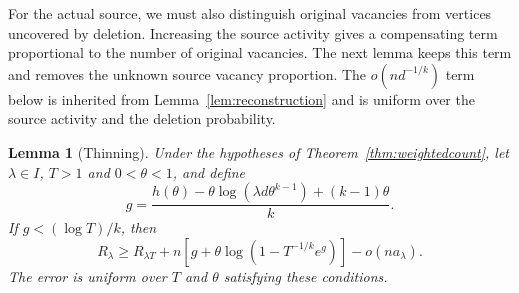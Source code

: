 \documentclass[11pt,reqno]{amsart}
\numberwithin{equation}{section}
\theoremstyle{plain}
\newtheorem{lemma}[theorem]{Lemma}
\theoremstyle{definition}
\begin{document}
For the actual source, we must also distinguish original vacancies from vertices uncovered by deletion.
Increasing the source activity gives a compensating term proportional to the number of original vacancies.
The next lemma keeps this term and removes the unknown source vacancy proportion.
The $o(nd^{-1/k})$ term below is inherited from Lemma~\ref{lem:reconstruction} and is uniform over the source activity and the deletion probability.

\begin{lemma}[Thinning]\label{lem:transfer}
    Under the hypotheses of Theorem~\ref{thm:weightedcount}, let $\lambda\in I$, $T>1$ and $0<\theta<1$, and define
    \[
        g=\frac{h(\theta)-\theta\log(\lambda d\theta^{k-1})+(k-1)\theta}{k}.
    \]
    If $g<(\log T)/k$, then
    \[
        R_\lambda\ge R_{\lambda T}+n\left[g+\theta\log(1-T^{-1/k}e^g)\right]-o(na_\lambda).
    \]
    The error is uniform over $T$ and $\theta$ satisfying these conditions.
\end{lemma}
\end{document}
